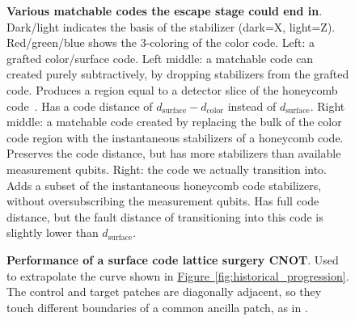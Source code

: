 \documentclass[onecolumn,unpublished,a4paper]{quantumarticle}
\theoremstyle{definition}
\newcommand{\fig}[1]{\hyperref[fig:#1]{Figure~\ref*{fig:#1}}}
\begin{document}
\begin{figure}
    \centering
    \begin{adjustwidth}{-2.5cm}{-2.5cm}
        \centering
    \end{adjustwidth}
    \caption{
        \textbf{Various matchable codes the escape stage could end in}.
        Dark/light indicates the basis of the stabilizer (dark=X, light=Z).
        Red/green/blue shows the 3-coloring of the color code.
        Left: a grafted color/surface code.
        Left middle: a matchable code can created purely subtractively, by dropping stabilizers from the grafted code.
        Produces a region equal to a detector slice of the honeycomb code~\cite{hastings2021dynamically,gidney2022planarhoneycomb}.
        Has a code distance of $d_\text{surface} - d_\text{color}$ instead of $d_\text{surface}$.
        Right middle: a matchable code created by replacing the bulk of the color code region with the instantaneous stabilizers of a honeycomb code.
        Preserves the code distance, but has more stabilizers than available measurement qubits.
        Right: the code we actually transition into.
        Adds a subset of the instantaneous honeycomb code stabilizers, without oversubscribing the measurement qubits.
        Has full code distance, but the fault distance of transitioning into this code is slightly lower than $d_\text{surface}$.
    }
    \label{fig:code-transition-alternates}
\end{figure}


\begin{figure}
    \centering
    \begin{adjustwidth}{-2.5cm}{-2.5cm}
        \centering
    \end{adjustwidth}
    \caption{
        \textbf{Performance of a surface code lattice surgery CNOT}.
        Used to extrapolate the curve shown in \fig{historical_progression}.
        The control and target patches are diagonally adjacent, so they touch different boundaries of a common ancilla patch, as in \cite{horsman2012latticesurgery}.
    }
    \label{fig:benchmark-cnot}
\end{figure}
\end{document}
